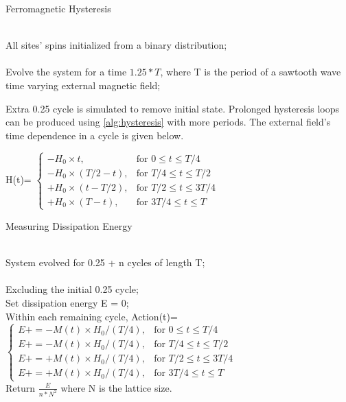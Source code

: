 \documentclass[%
showkeys,
bibnotes,
amsmath,amssymb,
floatfix,
]{revtex4-1}
\newcommand{\for}{\text{for }}
\begin{document}
\begin{algorithm}[H]
	\caption{Ferromagnetic Hysteresis}
	\label{alg:hysteresis}
	\begin{algorithmic}
		\REQUIRE ~~\\
		All sites' spins initialized from a binary distribution;\\
		\label{code:hysteresis:initialize}
		\ENSURE ~~\\
		Evolve the system for a time $1.25 * T$, where T is the period of a sawtooth wave time varying external magnetic field;\\
		\label{code:hysteresis:}
	\end{algorithmic}
\end{algorithm}

Extra 0.25 cycle is simulated to remove initial state. Prolonged hysteresis loops can be produced using \ref{alg:hysteresis} with more periods. The external field's time dependence in a cycle is given below.

H(t)=
$\left\{
\begin{array}{cc}
	-H_0 \times t,& \for 0\leqslant t \leqslant T/4 \\
	-H_0 \times (T/2-t),& \for T/4\leqslant t \leqslant T/2 \\
	+H_0 \times (t-T/2),& \for T/2\leqslant t \leqslant 3T/4 \\
	+H_0 \times (T-t),& \for 3T/4\leqslant t \leqslant T
\end{array}
\right
.$

\begin{algorithm}[H]
	\setstretch{1.35} 
	\caption{Measuring Dissipation Energy}
	\label{alg:dissipation}
	\begin{algorithmic}
		\REQUIRE ~~\\
		System evolved for 0.25 + n cycles of length T;\\
		\label{code:hysteresis:initialize}
		\ENSURE ~~\\
		Excluding the initial 0.25 cycle;\\
		Set dissipation energy E = 0;\\
		Within each remaining cycle, Action(t)=
		$\left\{
		\begin{array}{cc}
		E+=-M(t) \times H_0 / (T/4),& \for 0\leqslant t \leqslant T/4 \\
		E+=-M(t) \times H_0 / (T/4),& \for T/4\leqslant t \leqslant T/2 \\
		E+=+M(t) \times H_0 / (T/4),& \for T/2\leqslant t \leqslant 3T/4 \\
		E+=+M(t) \times H_0 / (T/4),& \for 3T/4\leqslant t \leqslant T
		\end{array}
		\right
		.$\\
		Return $\frac{E}{n * N^2}$ where N is the lattice size.
		
		\label{code:hysteresis:}
	\end{algorithmic}
\end{algorithm}
\end{document}
